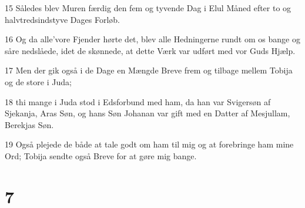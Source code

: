 \par 15 Således blev Muren færdig den fem og tyvende Dag i Elul Måned efter to og halvtredsindstyve Dages Forløb.
\par 16 Og da alle'vore Fjender hørte det, blev alle Hedningerne rundt om os bange og såre nedslåede, idet de skønnede, at dette Værk var udført med vor Guds Hjælp.
\par 17 Men der gik også i de Dage en Mængde Breve frem og tilbage mellem Tobija og de store i Juda;
\par 18 thi mange i Juda stod i Edsforbund med ham, da han var Svigersøn af Sjekanja, Aras Søn, og hans Søn Johanan var gift med en Datter af Mesjullam, Berekjas Søn.
\par 19 Også plejede de både at tale godt om ham til mig og at forebringe ham mine Ord; Tobija sendte også Breve for at gøre mig bange.

\chapter{7}

